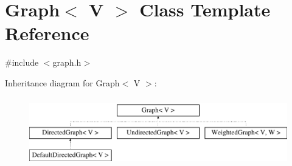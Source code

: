\hypertarget{classGraph}{}\section{Graph$<$ V $>$ Class Template Reference}
\label{classGraph}


{\ttfamily \#include $<$graph.\+h$>$}

Inheritance diagram for Graph$<$ V $>$\+:\begin{figure}[H]
\begin{center}
\leavevmode
\includegraphics[height=3.000000cm]{classGraph}
\end{center}
\end{figure}

